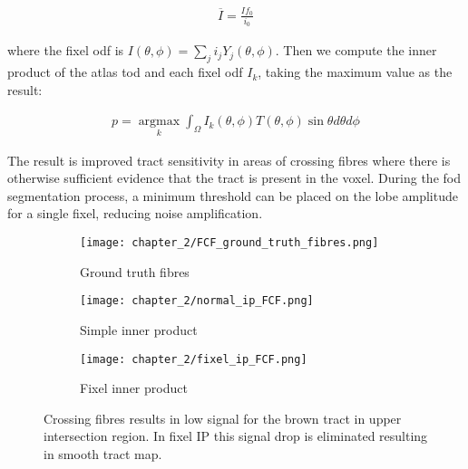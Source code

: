 \begin{align}
  \overline{I} = \frac{I f_0}{i_0}
\end{align}

where the fixel \gls{odf} is $I(\theta, \phi) = \sum_j i_j Y_j(\theta,\phi)$.
Then we compute the inner product of the atlas \gls{tod} and each fixel \gls{odf} $I_k$, taking the maximum value as the result:

\begin{align}
  p = \operatorname*{argmax}_k \int_\Omega I_k(\theta,\phi) T(\theta,\phi) \sin\theta d\theta d\phi
\end{align}

The result is improved tract sensitivity in areas of crossing fibres where there is otherwise sufficient evidence that the tract is present in the voxel.
During the \gls{fod} segmentation process, a minimum threshold can be placed on the lobe amplitude for a single fixel, reducing noise amplification.

\begin{figure}
  \centering
  \begin{subfigure}[b]{0.3\textwidth}
  \centering
  \texttt{[image: chapter\_2/FCF\_ground\_truth\_fibres.png]}
  \caption{Ground truth fibres}
  \label{}
  \end{subfigure}%
  \begin{subfigure}[b]{0.3\textwidth}
  \texttt{[image: chapter\_2/normal\_ip\_FCF.png]}
  \caption{Simple inner product}
  \label{}
  \end{subfigure}%
  \begin{subfigure}[b]{0.3\textwidth}
  \texttt{[image: chapter\_2/fixel\_ip\_FCF.png]}
  \caption{Fixel inner product}
  \label{}
  \end{subfigure}
  \caption{Crossing fibres results in low signal for the brown tract in upper intersection region. In fixel IP this signal drop is eliminated resulting in smooth tract map.}\label{fig:fixip}
\end{figure}
